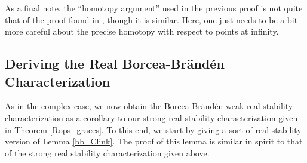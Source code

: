 \documentclass{article}
\theoremstyle{definition}
\theoremstyle{plain}
\begin{document}
As a final note, the ``homotopy argument'' used in the previous proof is not quite that of the proof found in \cite{bb1}, though it is similar. Here, one just needs to be a bit more careful about the precise homotopy with respect to points at infinity.

\subsection{Deriving the Real Borcea-Br{\"a}nd{\'e}n Characterization}\label{Rops_deriv_subsect}

As in the complex case, we now obtain the Borcea-Br{\"a}nd{\'e}n weak real stability characterization as a corollary to our strong real stability characterization given in Theorem \ref{Rops_graces}. To this end, we start by giving a sort of real stability version of Lemma \ref{bb_Clink}. The proof of this lemma is similar in spirit to that of the strong real stability characterization given above.
\end{document}
